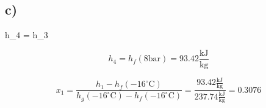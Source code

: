 

\subsection*{c)}

 \quad h_4 = h_3

\[
h_4 = h_f \left( 8 \text{bar} \right) = 93.42 \frac{\text{kJ}}{\text{kg}}
\]


\[
x_1 = \frac{h_1 - h_f \left( -16^\circ \text{C} \right)}{h_g \left( -16^\circ \text{C} \right) - h_f \left( -16^\circ \text{C} \right)} = \frac{93.42 \frac{\text{kJ}}{\text{kg}}}{237.74 \frac{\text{kJ}}{\text{kg}}} = 0.3076
\]